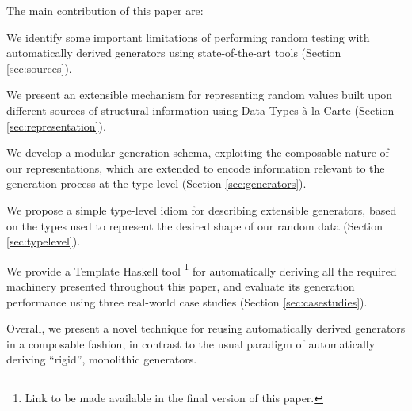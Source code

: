 %
%
The main contribution of this paper are:
%
\begin{CompactItemize}
\item We identify some important limitations of performing random testing with
  automatically derived generators using state-of-the-art tools (Section
  \ref{sec:sources}).
\item We present an extensible mechanism for representing random values built
  upon different sources of structural information using Data Types \`a la Carte
  (Section \ref{sec:representation}).
\item We develop a modular generation schema, exploiting the composable nature
  of our representations, which are extended to encode information relevant to
  the generation process at the type level (Section \ref{sec:generators}).
\item We propose a simple type-level idiom for describing extensible generators,
  based on the types used to represent the desired shape of our random data
  (Section \ref{sec:typelevel}).
\item We provide a Template Haskell tool%
  \footnote{Link to be made available in the final version of this paper.}
  for automatically deriving all the required machinery presented throughout
  this paper, and evaluate its generation performance using three real-world
  case studies (Section \ref{sec:casestudies}).
\end{CompactItemize}
%
Overall, we present a novel technique for reusing automatically derived
generators in a composable fashion, in contrast to the usual paradigm of
automatically deriving ``rigid'', monolithic generators.
